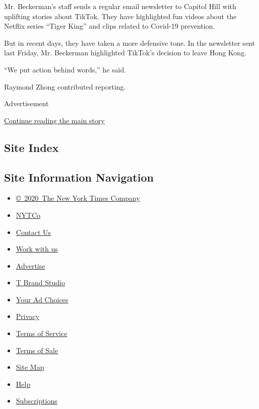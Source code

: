 Mr. Beckerman's staff sends a regular email newsletter to Capitol Hill
with uplifting stories about TikTok. They have highlighted fun videos
about the Netflix series ``Tiger King'' and clips related to Covid-19
prevention.

But in recent days, they have taken a more defensive tone. In the
newsletter sent last Friday, Mr. Beckerman highlighted TikTok's decision
to leave Hong Kong.

``We put action behind words,'' he said.

Raymond Zhong contributed reporting.

Advertisement

\protect\hyperlink{after-bottom}{Continue reading the main story}

\hypertarget{site-index}{%
\subsection{Site Index}\label{site-index}}

\hypertarget{site-information-navigation}{%
\subsection{Site Information
Navigation}\label{site-information-navigation}}

\begin{itemize}
\tightlist
\item
  \href{https://help.nytimes.com/hc/en-us/articles/115014792127-Copyright-notice}{©~2020~The
  New York Times Company}
\end{itemize}

\begin{itemize}
\tightlist
\item
  \href{https://www.nytco.com/}{NYTCo}
\item
  \href{https://help.nytimes.com/hc/en-us/articles/115015385887-Contact-Us}{Contact
  Us}
\item
  \href{https://www.nytco.com/careers/}{Work with us}
\item
  \href{https://nytmediakit.com/}{Advertise}
\item
  \href{http://www.tbrandstudio.com/}{T Brand Studio}
\item
  \href{https://www.nytimes.com/privacy/cookie-policy\#how-do-i-manage-trackers}{Your
  Ad Choices}
\item
  \href{https://www.nytimes.com/privacy}{Privacy}
\item
  \href{https://help.nytimes.com/hc/en-us/articles/115014893428-Terms-of-service}{Terms
  of Service}
\item
  \href{https://help.nytimes.com/hc/en-us/articles/115014893968-Terms-of-sale}{Terms
  of Sale}
\item
  \href{https://spiderbites.nytimes.com}{Site Map}
\item
  \href{https://help.nytimes.com/hc/en-us}{Help}
\item
  \href{https://www.nytimes.com/subscription?campaignId=37WXW}{Subscriptions}
\end{itemize}
